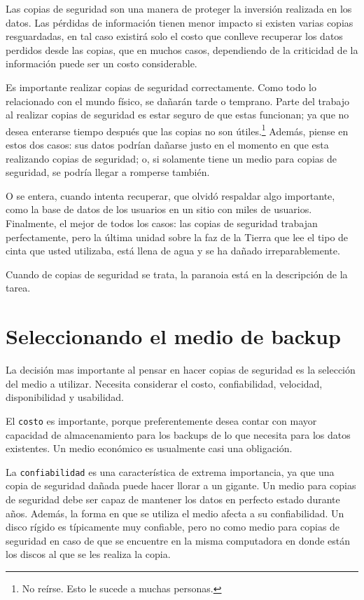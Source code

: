 \documentclass[12pt]{article}
\begin{document}
Las copias de seguridad son una manera de proteger la inversión realizada 
en los datos. Las pérdidas de información tienen menor impacto si existen 
varias copias resguardadas, en tal caso existirá solo el costo que conlleve
recuperar los datos perdidos desde las copias, que en muchos casos, 
dependiendo de la criticidad de la información puede ser un costo 
considerable. 

Es importante realizar copias de seguridad correctamente. Como todo lo 
relacionado con el mundo físico, se dañarán tarde o temprano. Parte del
trabajo al realizar copias de seguridad es estar seguro de que estas 
funcionan; ya que no desea enterarse tiempo después que las copias no son 
útiles.\footnote{No reírse. Esto le sucede a muchas personas.} Además,
 piense en estos dos casos: sus datos podrían dañarse justo en el momento 
en que esta realizando copias de seguridad; o, si solamente tiene un medio 
para copias de seguridad, se podría llegar a romperse también. 

O se entera, cuando intenta recuperar, que olvidó respaldar algo importante,
como la base de datos de los usuarios en un sitio con miles de usuarios. 
Finalmente, el mejor de todos los casos: las copias de seguridad trabajan 
perfectamente, pero la última unidad sobre la faz de la Tierra que lee el 
tipo de cinta que usted utilizaba, está llena de agua y se ha dañado 
irreparablemente.

Cuando de copias de seguridad se trata, la paranoia está en la descripción 
de la tarea.

\section*{ Seleccionando el medio de backup}

La decisión mas importante al pensar en hacer copias de seguridad es la 
selección del medio a utilizar. Necesita considerar el costo, 
confiabilidad, velocidad, disponibilidad y usabilidad.

El \texttt{costo} es importante, porque preferentemente desea contar con 
mayor 
capacidad de almacenamiento para los backups de lo que necesita para los 
datos existentes. Un medio económico es usualmente casi una obligación.

La \texttt{confiabilidad} es una característica de extrema importancia, 
ya que una 
copia de seguridad dañada puede hacer llorar a un gigante. Un medio para 
copias de seguridad debe ser capaz de mantener los datos en perfecto 
estado durante años. Además, la forma en que se utiliza el medio afecta 
a su confiabilidad. Un disco rígido es típicamente muy confiable, pero 
no como medio para copias de seguridad en caso de que se encuentre en 
la misma computadora en donde están los discos al que se les realiza la 
copia.
\end{document}
